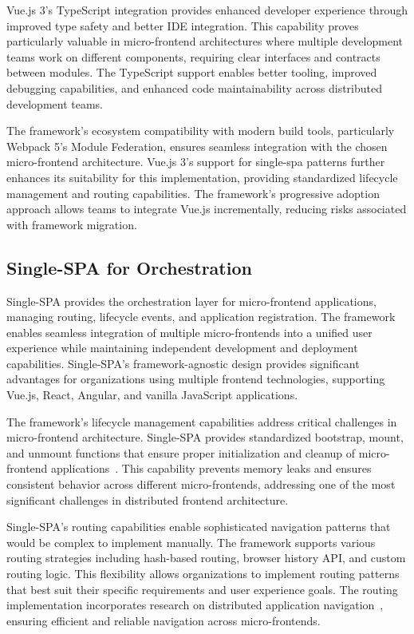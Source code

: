 \documentclass[12pt,a4paper]{report}
\begin{document}
Vue.js 3's TypeScript integration provides enhanced developer experience through improved type safety and better IDE integration. This capability proves particularly valuable in micro-frontend architectures where multiple development teams work on different components, requiring clear interfaces and contracts between modules. The TypeScript support enables better tooling, improved debugging capabilities, and enhanced code maintainability across distributed development teams.

The framework's ecosystem compatibility with modern build tools, particularly Webpack 5's Module Federation, ensures seamless integration with the chosen micro-frontend architecture. Vue.js 3's support for single-spa patterns further enhances its suitability for this implementation, providing standardized lifecycle management and routing capabilities. The framework's progressive adoption approach allows teams to integrate Vue.js incrementally, reducing risks associated with framework migration.

\subsection{Single-SPA for Orchestration}

Single-SPA provides the orchestration layer for micro-frontend applications, managing routing, lifecycle events, and application registration. The framework enables seamless integration of multiple micro-frontends into a unified user experience while maintaining independent development and deployment capabilities. Single-SPA's framework-agnostic design provides significant advantages for organizations using multiple frontend technologies, supporting Vue.js, React, Angular, and vanilla JavaScript applications.

The framework's lifecycle management capabilities address critical challenges in micro-frontend architecture. Single-SPA provides standardized bootstrap, mount, and unmount functions that ensure proper initialization and cleanup of micro-frontend applications~\cite{canter2021single-spa}. This capability prevents memory leaks and ensures consistent behavior across different micro-frontends, addressing one of the most significant challenges in distributed frontend architecture.

Single-SPA's routing capabilities enable sophisticated navigation patterns that would be complex to implement manually. The framework supports various routing strategies including hash-based routing, browser history API, and custom routing logic. This flexibility allows organizations to implement routing patterns that best suit their specific requirements and user experience goals. The routing implementation incorporates research on distributed application navigation~\cite{canter2020single-spa-orchestration}, ensuring efficient and reliable navigation across micro-frontends.
\end{document}
